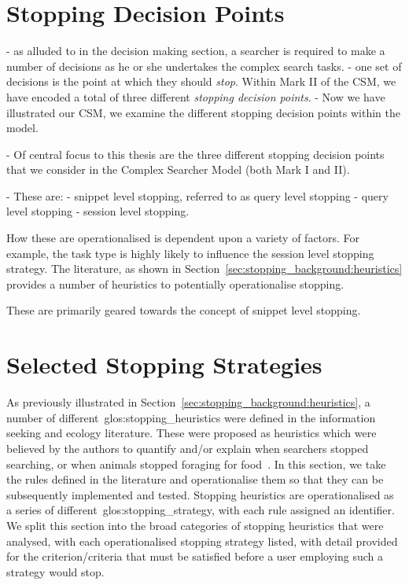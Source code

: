 \section{Stopping Decision Points}\label{sec:proposal:stopping_points}
- as alluded to in the decision making section, a searcher is required to make a number of decisions as he or she undertakes the complex search tasks.
- one set of decisions is the point at which they should \emph{stop}. Within Mark II of the CSM, we have encoded a total of three different \emph{stopping decision points}.
- Now we have illustrated our CSM, we examine the different stopping decision points within the model.

- Of central focus to this thesis are the three different stopping decision points that we consider in the Complex Searcher Model (both Mark I and II).

- These are:
    - snippet level stopping, referred to as query level stopping
    - query level stopping
    - session level stopping.

How these are operationalised is dependent upon a variety of factors. For example, the task type is highly likely to influence the session level stopping strategy. The literature, as shown in Section~\ref{sec:stopping_background:heuristics} provides a number of heuristics to potentially operationalise stopping.

These are primarily geared towards the concept of snippet level stopping.

\section{Selected Stopping Strategies}\label{sec:proposal:strategies}
As previously illustrated in Section~\ref{sec:stopping_background:heuristics}, a number of different~\glspl{glos:stopping_heuristic} were defined in the information seeking and ecology literature. These were proposed as heuristics which were believed by the authors to quantify and/or explain when searchers stopped searching, or when animals stopped foraging for food~\cite{maxwell2015stopping_strategies}. In this section, we take the rules defined in the literature and operationalise them so that they can be subsequently implemented and tested. Stopping heuristics are operationalised as a series of different~\gls{glos:stopping_strategy}, with each rule assigned an identifier. We split this section into the  broad categories of stopping heuristics that were analysed, with each operationalised stopping strategy listed, with detail provided for the criterion/criteria that must be satisfied before a user employing such a strategy would stop. 

